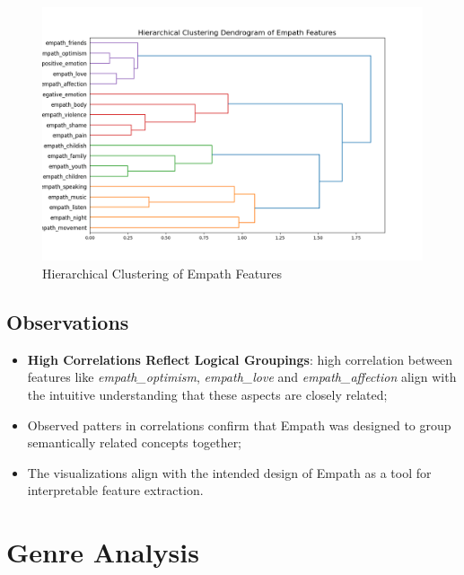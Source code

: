 \begin{center}
\begin{figure}[H]
  \centering
  \includegraphics[width=6in]{img/dendrogram_empath.png}
  \caption{Hierarchical Clustering of Empath Features}
  \label{Figure:dendrogram_spotify_features}
\end{figure}
\end{center}


\subsection*{Observations}

\begin{itemize}
  \item \textbf{High Correlations Reflect Logical Groupings}: high correlation
    between features like \textit{empath\_optimism}, \textit{empath\_love} and
    \textit{empath\_affection} align with the intuitive understanding that
    these aspects are closely related;
  \item Observed patters in correlations confirm that Empath was designed to
    group semantically related concepts together;
  \item The visualizations align with the intended design of Empath as a tool
    for interpretable feature extraction.
\end{itemize}



\section{Genre Analysis}

